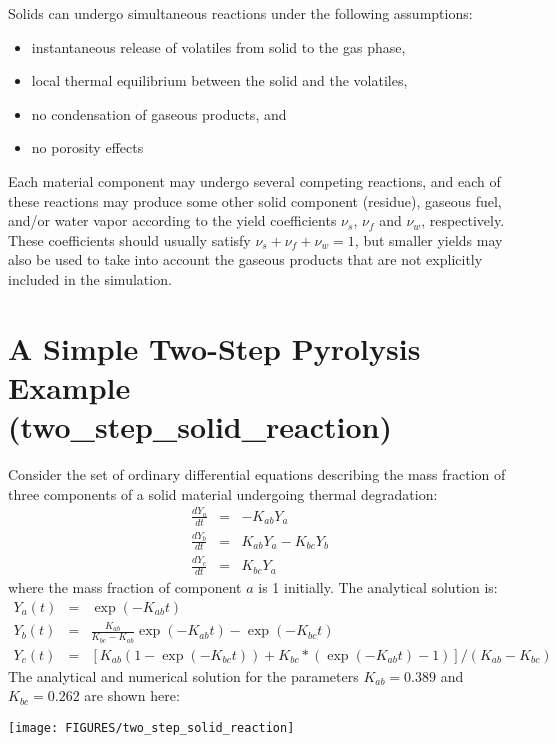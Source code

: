 \documentclass[11pt]{book}
\begin{document}
Solids can undergo simultaneous reactions under the following assumptions:
\begin{itemize}
\setlength{\itemsep}{0.0in}
\item instantaneous release of volatiles from solid to the gas phase,
\item local thermal equilibrium between the solid and the volatiles,
\item no condensation of gaseous products, and
\item no porosity effects
\end{itemize}
Each material component may undergo several competing reactions, and
each of these reactions may produce some other solid component
(residue), gaseous fuel, and/or water vapor according to
the yield coefficients $\nu_s$, $\nu_f$ and $\nu_w$, respectively.
These coefficients should usually satisfy $\nu_s + \nu_f + \nu_w = 1$,
but smaller yields may also be used to take into account the gaseous
products that are not explicitly included in the simulation.


\clearpage

\section{A Simple Two-Step Pyrolysis Example (\texorpdfstring{{\bf two\_step\_solid\_reaction}}{two\_step\_solid\_reaction})}
\label{two_step_solid_reaction}

Consider  the set  of ordinary  differential equations  describing the mass  fraction of  three  components of  a  solid material  undergoing thermal
degradation:
\begin{eqnarray}
    \frac{dY_a}{dt} &=&  -K_{ab} Y_a \nonumber  \\
    \frac{dY_b}{dt} &=&   K_{ab} Y_a  -  K_{bc}  Y_b  \\
    \frac{dY_c}{dt} &=&   K_{bc} Y_a
    \nonumber
\end{eqnarray}
where  the  mass  fraction  of  component  $a$  is  1  initially.  The
analytical solution is:
\begin{eqnarray}
    Y_a(t)    &=&    \exp(-K_{ab}t)    \nonumber   \\
    Y_b(t)    &=&    \frac{K_{ab}}{K_{bc}-K_{ab}} \exp(-K_{ab} t)  - \exp(-K_{bc} t) \\
    Y_c(t)    &=&    \left[   K_{ab}    (1-\exp(-K_{bc} t) )    +  K_{bc}*(\exp(-K_{ab} t) -1) \right] / (K_{ab}-K_{bc})
\end{eqnarray}
The analytical and  numerical solution for the parameters $K_{ab} = 0.389$ and $K_{bc} = 0.262$ are shown here:

\begin{center}
\texttt{[image: FIGURES/two\_step\_solid\_reaction]}
\end{center}








\end{document}
